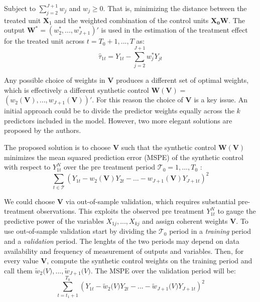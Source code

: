 \documentclass[12pt,a4paper,draft]{article}
\begin{document}
Subject to $\sum_{j=2}^{J+1}w_j$ and $w_j \geq 0$. That is, minimizing the distance 
between the treated unit $\mathbf{X}_1$ and the weighted combination of the 
control units $\mathbf{X_0} \mathbf{W}$. The output $\mathbf{W}^*=
\left( w_2^*,...,w_{J+1}^*\right) '$ is used in the estimation of the treatment 
effect for the treated unit across $t=T_0+1,...,T$ as:
\begin{equation}
    \hat{\tau}_{1t} = Y_{1t} - \sum_{j=2}^{J+1}{w^*_j Y_{jt}}
\end{equation}


Any possible choice of weights in $\mathbf{V}$ produces a different set of optimal 
weights, which is effectively a different synthetic control 
$\mathbf{W}(\mathbf{V})=$ \newline $\left(w_2(\mathbf{V}),...,w_{J+1}(\mathbf{V})\right)'$.
For this reason the choice of $\mathbf{V}$ is a key issue. An initial approach could 
be to divide the predictor weights equally across the $k$ predictors included in the 
model. However, two more elegant solutions are proposed by the authors.


The proposed solution is to choose $\mathbf{V}$ such that the synthetic 
control $\mathbf{W}(\mathbf{V})$ minimizes the mean squared prediction error (MSPE) 
of the synthetic control with respect to $Y_{1t}^N$ over the pre treatment period
$\mathcal{T}_0 = 1,..., T_0$ : 
\begin{equation}
    \sum_{t\in\mathcal{T}} {\left(
    Y_{1t}-w_2 \mathbf{(V)} Y_{2t}-...-w_{J+1}(\mathbf{V})Y_{J+1t}
\right)} ^2
\end{equation}

We could choose $\mathbf{V}$ via out-of-sample validation, which requires substantial 
pre-treatment observations. This exploits the observed pre treatment $Y_{1t}^N$
to gauge the predictive power of the variables $X_{1j},...,X_{kj}$ and assign 
coherent weights $\mathbf{V}$. To use out-of-sample validation start by 
dividing the $\mathcal{T}_0$ period in a \emph{training} period and a 
\emph{validation} period. The lenghts of the two periods may depend on data 
availability and frequency of measurement of outputs and variables. Then, for 
every value $\mathbf{V}$, compute the synthetic control weights on the training 
period and call them $\tilde{w}_2 \mathbf(V), ..., \tilde{w}_{J+1} \mathbf(V)$.
The MSPE over the validation period will be:
\begin{equation}
    \sum_{t=t_1+1}^{T_0} \left(
    Y_{1t}-\tilde{w}_2 \mathbf(V) Y_{2t} - ... - 
    \tilde{w}_{J+1} \mathbf(V) Y_{J+1t} \right)^2
\end{equation}
\end{document}
